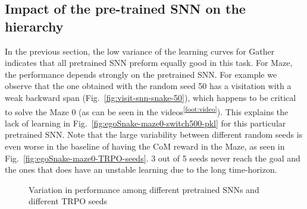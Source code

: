 \documentclass{article} %
\begin{document}
\subsection{Impact of the pre-trained SNN on the hierarchy}
\label{sec:seed_impact}
In the previous section, the low variance of the learning curves for Gather indicates that all pretrained SNN preform equally good in this task. For Maze, the performance depends strongly on the pretrained SNN. For example we observe that the one obtained with the random seed 50 has a visitation with a weak backward span (Fig.\ \ref{fig:visit-snn-snake-50}), which happens to be critical to solve the Maze 0 (as can be seen in the videos\textsuperscript{\ref{foot:video}}). This explains the lack of learning in Fig.\ \ref{fig:egoSnake-maze0-switch500-pkl} for this particular pretrained SNN. Note that the large variability between different random seeds is even worse in the baseline of having the CoM reward in the Maze, as seen in Fig.\ \ref{fig:egoSnake-maze0-TRPO-seeds}. 3 out of 5 seeds never reach the goal and the ones that does have an unstable learning due to the long time-horizon.

\begin{figure}[h]
	\centering
    \vspace{-10pt}         
	\caption{Variation in performance among different pretrained SNNs and different TRPO seeds}
	\label{fig:egoSnake-learning-curves-pkl}
\end{figure}
\end{document}

